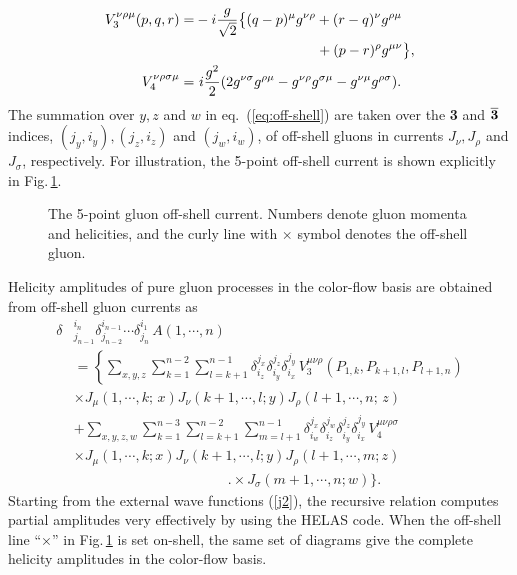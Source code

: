 \begin{align}
V_3^{\nu\rho\mu}(p,q,r)=&-i\frac{g}{\sqrt{2}}\bigl\{(q-p)^{\mu}g^{\nu\rho}+(r-q)^{\nu}g^{\rho\mu}\nonumber\\
&\hspace{8.7em}+(p-r)^{\rho}g^{\mu\nu}\bigr\},\\
V_4^{\nu\rho\sigma\mu}=&\,\,i\frac{g^2}{2}(2g^{\nu\sigma}g^{\rho\mu}-g^{\nu\rho}g^{\sigma\mu}-g^{\nu\mu}g^{\rho\sigma}).
\end{align}
The summation over $y,z$ and $w$ in eq.~(\ref{eq:off-shell}) are taken over the {\bf 3} and $\overline{{\bf 3}}$ indices, $(j_y, i_y), (j_z, i_z)$
 and $(j_w, i_w)$, of off-shell gluons in currents $J_{\nu}, J_{\rho}$ and $J_{\sigma}$, respectively.
 For
illustration, the 5-point off-shell current is shown explicitly in
Fig.\,\ref{fig:5offshell}.
\begin{figure}
\caption{The 5-point gluon off-shell current. Numbers denote gluon momenta
 and helicities, and the curly line with $\times$ symbol denotes the off-shell
 gluon.}
\label{fig:5offshell}
\end{figure}

Helicity amplitudes of pure gluon processes in the color-flow basis are obtained from off-shell
gluon currents as
\begin{align}
\delta&_{j_{n-1}}^{i_n}\delta_{j_{n-2}}^{i_{n-1}}\cdots\delta_{j_n}^{i_1}\,A(1,\cdots,n)\nonumber\\
&=\left\{\sum_{x,y,z}\sum_{k=1}^{n-2}\sum_{l=k+1}^{n-1}
\delta_{i_z}^{j_x}\delta_{i_y}^{j_z}\delta_{i_x}^{j_y}\,V^{\mu\nu\rho}_3(P_{1,k}, P_{k+1,l},P_{l+1,n})\right.\nonumber\\
&\times J_{\mu}(1,\cdots,k;\,x)J_{\nu}(k+1,\cdots,l; y) J_{\rho}(l+1,\cdots,n;\,z)\nonumber\\
&+\sum_{x,y,z,w}\sum_{k=1}^{n-3}\sum_{l=k+1}^{n-2}\sum_{m=l+1}^{n-1}
\delta_{i_w}^{j_x}\delta_{i_z}^{j_w}\delta_{i_y}^{j_z}\delta_{i_x}^{j_y}\,
V^{\mu\nu\rho\sigma}_4\nonumber\\
& \times J_{\mu}(1,\cdots,k;x) J_{\nu}(k+1,\cdots,l;y) J_{\rho}(l+1,\cdots,m;z) \nonumber\\
&\hspace{11em}\Biggl. \times J_{\sigma}(m+1,\cdots,n;w)\Biggr\}.
\label{eq:amplitude}
\end{align}
Starting from the external wave functions (\ref{j2}), the recursive
relation computes partial amplitudes very effectively by using the
HELAS code. When the off-shell line ``$\times$'' in Fig.\,\ref{fig:5offshell} is set
on-shell, the same set of diagrams give the complete helicity amplitudes
in the color-flow basis.

